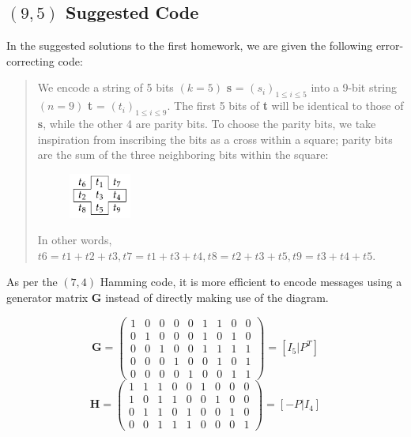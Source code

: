 \documentclass[12pt, a4paper]{article}
\begin{document}
\subsection{$(9,5)$ Suggested Code}
In the suggested solutions to the first homework, we are given the following error-correcting code:

\begin{quote}
We encode a string of 5 bits $(k = 5)$ \textbf{s} = $(s_i)_{1 \leq i \leq5}$ into a 9-bit string $(n = 9)$ \textbf{t} = $(t_i)_{1 \leq i \leq 9}$. The first 5 bits of \textbf{t} will be identical to those of \textbf{s}, while the other 4 are parity bits. To choose the parity bits, we take inspiration from inscribing the bits as a cross within a square; parity bits are the sum of the three neighboring bits within the square:
\begin{figure}[H]
	\centering
	\includegraphics[width=0.2\textwidth]{suggested_diagram.png}
\end{figure}
In other words,\\
$t6 = t1+t2+t3, t7 = t1+t3+t4, t8 = t2+t3+t5, t9 = t3+t4+t5$.
\end{quote}

As per the $(7,4)$ Hamming code, it is more efficient to encode messages using a generator matrix \textbf{G} instead of directly making use of the diagram.

$$
\textbf{G} = 
\left(
\begin{array}{ccccccccc}
1 & 0 & 0 & 0 & 0 & 1 & 1 & 0 & 0\\
0 & 1 & 0 & 0 & 0 & 1 & 0 & 1 & 0\\
0 & 0 & 1 & 0 & 0 & 1 & 1 & 1 & 1\\
0 & 0 & 0 & 1 & 0 & 0 & 1 & 0 & 1\\
0 & 0 & 0 & 0 & 1 & 0 & 0 & 1 & 1
\end{array}
\right)
=
\left[
I_5 \vert P^T
\right]
$$
$$
\textbf{H} =
\left(
\begin{array}{ccccccccc}
1 & 1 & 1 & 0 & 0 & 1 & 0 & 0 & 0\\
1 & 0 & 1 & 1 & 0 & 0 & 1 & 0 & 0\\
0 & 1 & 1 & 0 & 1 & 0 & 0 & 1 & 0\\
0 & 0 & 1 & 1 & 1 & 0 & 0 & 0 & 1
\end{array}
\right)
=
\left[
-P \vert I_4
\right]
$$
\end{document}
